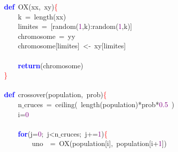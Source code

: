 \noindent
\mbox{}\textbf{\textcolor{Blue}{def}}\ OX\textcolor{BrickRed}{(}xx\textcolor{BrickRed}{,}\ xy\textcolor{BrickRed}{)}\textcolor{Red}{\{} \\
\mbox{}\ \ \ \ k\ \textcolor{BrickRed}{=}\ length\textcolor{BrickRed}{(}xx\textcolor{BrickRed}{)} \\
\mbox{}\ \ \ \ limites\ \textcolor{BrickRed}{=}\ \textcolor{BrickRed}{[}random\textcolor{BrickRed}{(}\textcolor{Purple}{1}\textcolor{BrickRed}{,}k\textcolor{BrickRed}{):}random\textcolor{BrickRed}{(}\textcolor{Purple}{1}\textcolor{BrickRed}{,}k\textcolor{BrickRed}{)]} \\
\mbox{}\ \ \ \ chromosome\ \textcolor{BrickRed}{=}\ yy \\
\mbox{}\ \ \ \ chromosome\textcolor{BrickRed}{[}limites\textcolor{BrickRed}{]}\ \textcolor{BrickRed}{\textless{}-}\ xy\textcolor{BrickRed}{[}limites\textcolor{BrickRed}{]} \\
\mbox{} \\
\mbox{}\ \ \ \ \textbf{\textcolor{Blue}{return}}\textcolor{BrickRed}{(}chromosome\textcolor{BrickRed}{)} \\
\mbox{}\textcolor{Red}{\}} \\
\mbox{} \\
\mbox{}\textbf{\textcolor{Blue}{def}}\ crossover\textcolor{BrickRed}{(}population\textcolor{BrickRed}{,}\ prob\textcolor{BrickRed}{)}\textcolor{Red}{\{} \\
\mbox{}\ \ \ \ n$\_$cruces\ \textcolor{BrickRed}{=}\ ceiling\textcolor{BrickRed}{(}\ length\textcolor{BrickRed}{(}population\textcolor{BrickRed}{)*}prob\textcolor{BrickRed}{*}\textcolor{Purple}{0.5}\ \textcolor{BrickRed}{)} \\
\mbox{}\ \ \ \ i\textcolor{BrickRed}{=}\textcolor{Purple}{0} \\
\mbox{} \\
\mbox{}\ \ \ \ \textbf{\textcolor{Blue}{for}}\textcolor{BrickRed}{(}j\textcolor{BrickRed}{=}\textcolor{Purple}{0}\textcolor{BrickRed}{;}\ j\textcolor{BrickRed}{\textless{}}n$\_$cruces\textcolor{BrickRed}{;}\ j\textcolor{BrickRed}{+=}\textcolor{Purple}{1}\textcolor{BrickRed}{)}\textcolor{Red}{\{} \\
\mbox{}\ \ \ \ \ \ \ \ uno\ \ \textcolor{BrickRed}{=}\ OX\textcolor{BrickRed}{(}population\textcolor{BrickRed}{[}i\textcolor{BrickRed}{],}\ population\textcolor{BrickRed}{[}i\textcolor{BrickRed}{+}\textcolor{Purple}{1}\textcolor{BrickRed}{])} \\
